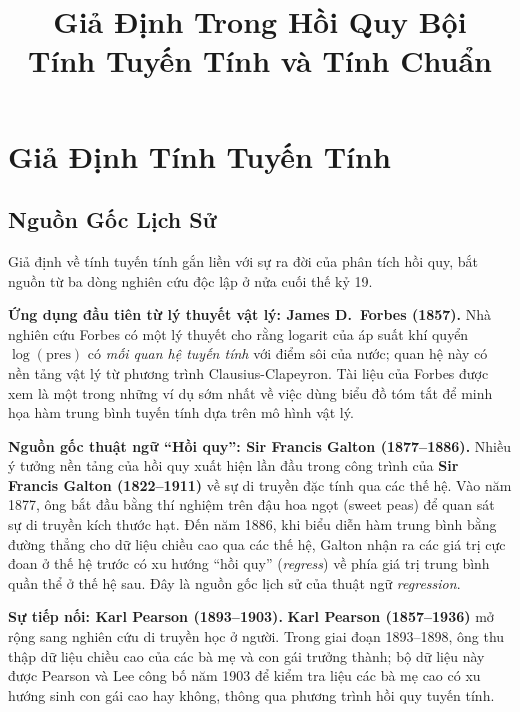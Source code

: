 \documentclass[12pt, a4paper]{article}
\title{\textbf{Giả Định Trong Hồi Quy Bội}\\[4pt]
       \large Tính Tuyến Tính và Tính Chuẩn}
\begin{document}
\maketitle
\tableofcontents
\newpage

\section{Giả Định Tính Tuyến Tính}

\subsection{Nguồn Gốc Lịch Sử}

Giả định về tính tuyến tính gắn liền với sự ra đời của phân tích hồi quy, bắt nguồn từ ba dòng nghiên cứu độc lập ở nửa cuối thế kỷ 19.

\textbf{Ứng dụng đầu tiên từ lý thuyết vật lý: James D.\ Forbes (1857).}
Nhà nghiên cứu Forbes có một lý thuyết cho rằng logarit của áp suất khí quyển $\log(\text{pres})$ có \textit{mối quan hệ tuyến tính} với điểm sôi của nước; quan hệ này có nền tảng vật lý từ phương trình Clausius-Clapeyron. Tài liệu của Forbes được xem là một trong những ví dụ sớm nhất về việc dùng biểu đồ tóm tắt để minh họa hàm trung bình tuyến tính dựa trên mô hình vật lý.

\textbf{Nguồn gốc thuật ngữ ``Hồi quy'': Sir Francis Galton (1877--1886).}
Nhiều ý tưởng nền tảng của hồi quy xuất hiện lần đầu trong công trình của \textbf{Sir Francis Galton (1822--1911)} về sự di truyền đặc tính qua các thế hệ. Vào năm 1877, ông bắt đầu bằng thí nghiệm trên đậu hoa ngọt (sweet peas) để quan sát sự di truyền kích thước hạt. Đến năm 1886, khi biểu diễn hàm trung bình bằng đường thẳng cho dữ liệu chiều cao qua các thế hệ, Galton nhận ra các giá trị cực đoan ở thế hệ trước có xu hướng ``hồi quy'' (\textit{regress}) về phía giá trị trung bình quần thể ở thế hệ sau. Đây là nguồn gốc lịch sử của thuật ngữ \textit{regression}.

\textbf{Sự tiếp nối: Karl Pearson (1893--1903).}
\textbf{Karl Pearson (1857--1936)} mở rộng sang nghiên cứu di truyền học ở người. Trong giai đoạn 1893--1898, ông thu thập dữ liệu chiều cao của các bà mẹ và con gái trưởng thành; bộ dữ liệu này được Pearson và Lee công bố năm 1903 để kiểm tra liệu các bà mẹ cao có xu hướng sinh con gái cao hay không, thông qua phương trình hồi quy tuyến tính.
\end{document}
